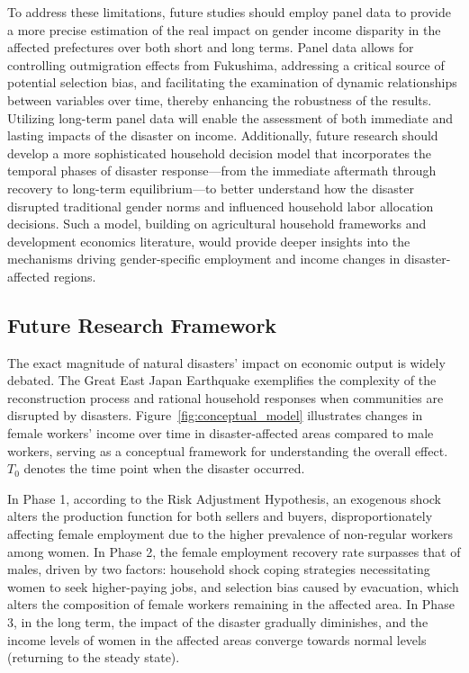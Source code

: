 \documentclass[a4paper,12pt]{article}
\begin{document}
To address these limitations, future studies should employ panel data to provide a more precise estimation of the real impact on gender income disparity in the affected prefectures over both short and long terms. Panel data allows for controlling outmigration effects from Fukushima, addressing a critical source of potential selection bias, and facilitating the examination of dynamic relationships between variables over time, thereby enhancing the robustness of the results. Utilizing long-term panel data will enable the assessment of both immediate and lasting impacts of the disaster on income. Additionally, future research should develop a more sophisticated household decision model that incorporates the temporal phases of disaster response—from the immediate aftermath through recovery to long-term equilibrium—to better understand how the disaster disrupted traditional gender norms and influenced household labor allocation decisions. Such a model, building on agricultural household frameworks and development economics literature, would provide deeper insights into the mechanisms driving gender-specific employment and income changes in disaster-affected regions.

\subsection{Future Research Framework}

The exact magnitude of natural disasters' impact on economic output is widely debated. The Great East Japan Earthquake exemplifies the complexity of the reconstruction process and rational household responses when communities are disrupted by disasters. Figure~\ref{fig:conceptual_model} illustrates changes in female workers' income over time in disaster-affected areas compared to male workers, serving as a conceptual framework for understanding the overall effect. $T_{0}$ denotes the time point when the disaster occurred.

In Phase 1, according to the Risk Adjustment Hypothesis, an exogenous shock alters the production function for both sellers and buyers, disproportionately affecting female employment due to the higher prevalence of non-regular workers among women. In Phase 2, the female employment recovery rate surpasses that of males, driven by two factors: household shock coping strategies necessitating women to seek higher-paying jobs, and selection bias caused by evacuation, which alters the composition of female workers remaining in the affected area. In Phase 3, in the long term, the impact of the disaster gradually diminishes, and the income levels of women in the affected areas converge towards normal levels (returning to the steady state).
\end{document}
